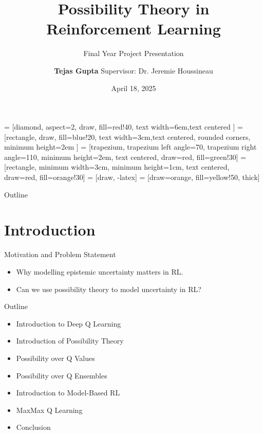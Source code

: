 \documentclass[11pt,aspectratio=169]{beamer}
\title[FYP Thesis]{\large Possibility Theory in Reinforcement Learning}
\subtitle{Final Year Project Presentation}
\author[Tejas Gupta]{\textbf{Tejas Gupta} Supervisor: Dr. Jeremie Houssineau}
\institute[Nanyang Tech. U.]{School of Physical \& Mathematical Sciences\\NTU Singapore}
\date[April 2025]{April 18, 2025}
\begin{document}
 = [diamond, aspect=2, draw, fill=red!40, text width=6em,text centered ]
 = [rectangle, draw, fill=blue!20, text width=3cm,text centered, rounded corners, minimum height=2em ]
 = [trapezium, trapezium left angle=70, trapezium right angle=110, minimum height=2em, text centered, draw=red, fill=green!30]
 = [rectangle, minimum width=3cm, minimum height=1cm, text centered, draw=red, fill=orange!30]
 = [draw, -latex] = [draw=orange, fill=yellow!50, thick]
\begin{frame}
  \maketitle
\end{frame}

\begin{frame}{Outline}
  \tableofcontents
\end{frame}

\section{Introduction}
\begin{frame}{Motivation and Problem Statement}
  \begin{itemize}
    \item Why modelling epistemic uncertainty matters in RL.
    \item Can we use possibility theory to model uncertainty in RL?
  \end{itemize}
\end{frame}

\begin{frame}{Outline}
  \begin{itemize}
    \item Introduction to Deep Q Learning
    \item Introduction of Possibility Theory
    \item Possibility over Q Values
    \item Possibility over Q Ensembles
    \item Introduction to Model-Based RL
    \item MaxMax Q Learning
    \item Conclusion
  \end{itemize}
\end{frame}
\end{document}
